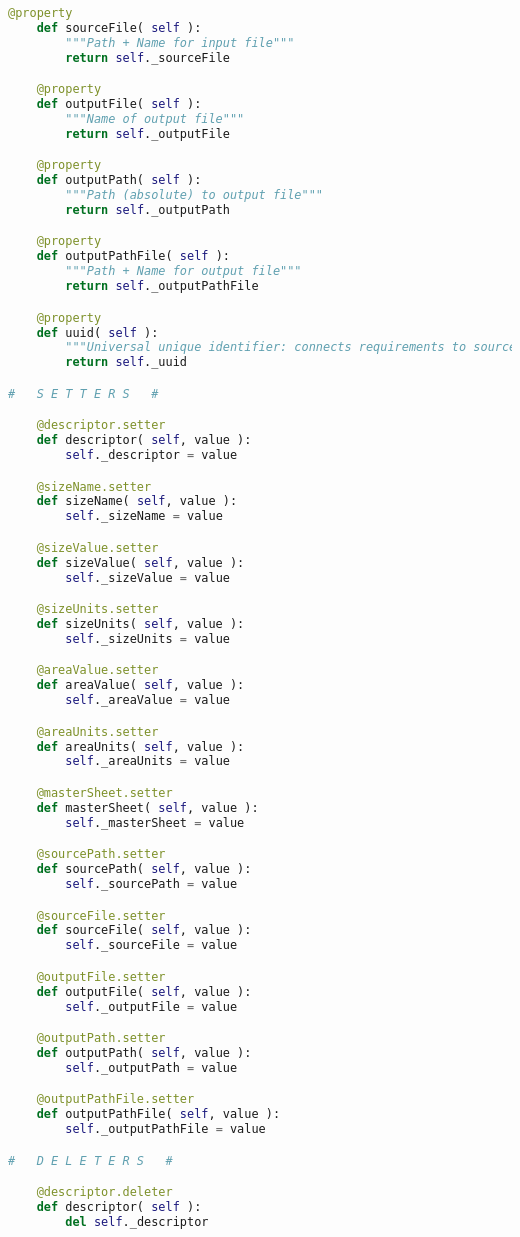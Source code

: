 {{\begin{lstlisting}[language=Python]
    @property
    def sourceFile( self ):
        """Path + Name for input file"""
        return self._sourceFile

    @property
    def outputFile( self ):
        """Name of output file"""
        return self._outputFile

    @property
    def outputPath( self ):
        """Path (absolute) to output file"""
        return self._outputPath

    @property
    def outputPathFile( self ):
        """Path + Name for output file"""
        return self._outputPathFile

    @property
    def uuid( self ):
        """Universal unique identifier: connects requirements to source document"""
        return self._uuid

#   S E T T E R S   #

    @descriptor.setter
    def descriptor( self, value ):
        self._descriptor = value

    @sizeName.setter
    def sizeName( self, value ):
        self._sizeName = value

    @sizeValue.setter
    def sizeValue( self, value ):
        self._sizeValue = value

    @sizeUnits.setter
    def sizeUnits( self, value ):
        self._sizeUnits = value

    @areaValue.setter
    def areaValue( self, value ):
        self._areaValue = value

    @areaUnits.setter
    def areaUnits( self, value ):
        self._areaUnits = value

    @masterSheet.setter
    def masterSheet( self, value ):
        self._masterSheet = value

    @sourcePath.setter
    def sourcePath( self, value ):
        self._sourcePath = value

    @sourceFile.setter
    def sourceFile( self, value ):
        self._sourceFile = value

    @outputFile.setter
    def outputFile( self, value ):
        self._outputFile = value

    @outputPath.setter
    def outputPath( self, value ):
        self._outputPath = value

    @outputPathFile.setter
    def outputPathFile( self, value ):
        self._outputPathFile = value

#   D E L E T E R S   #

    @descriptor.deleter
    def descriptor( self ):
        del self._descriptor


\end{lstlisting}}}
